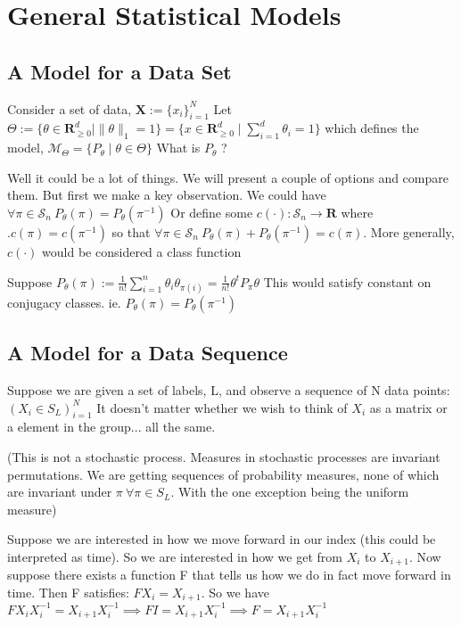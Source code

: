 \documentclass{article}
\theoremstyle{definition}
\begin{document}
\section{General Statistical Models}
\subsection{A Model for a Data Set}
Consider a set of data, \( \mathbf{X} := \{ x_i \}_{i=1}^N\)
Let \(
\Theta := \{ \theta \in \mathbf{R}_{\geq 0}^d \mid  \|\theta\|_1 = 1\} = \{x\in \mathbf{R}_{\geq 0}^d \mid \sum_{i=1}^d \theta_i = 1\} 
\) 
which defines the model, \(
\mathcal{M}_\Theta = \{ P_\theta \mid \theta \in \Theta \}
\)
What is $P_\theta$ ? 

Well it could be a lot of things. We will present a couple of options and compare them. But first we make a key observation. 
We could have $ \forall \pi \in \mathcal{S}_n \: P_\theta(\pi) = P_\theta(\pi^{-1}) $
Or define some $c(\cdot):\mathcal{S}_n \rightarrow \mathbf{R} $ where $. c(\pi) = c(\pi^{-1}) $ so that $ \forall \pi \in \mathcal{S}_n \: P_\theta(\pi) + P_\theta(\pi^{-1})  = c( \pi ) $. More generally, $c(\cdot) $ would be considered a class function

Suppose \( P_\theta(\pi) := \frac{1}{n!}\sum_{i=1}^n \theta_i\theta_{\pi(i)} = \frac{1}{n!}\theta^t P_\pi\theta \) 
This would satisfy constant on conjugacy classes. ie. $ P_\theta(\pi) = P_\theta(\pi^{-1}) $

\subsection{A Model for a Data Sequence}
Suppose we are given a set of labels, L, and observe a sequence of N data points: $ (X_i \in S_L)_{i=1}^N$
It doesn't matter whether we wish to think of $X_i$ as a matrix or a element in the group... all the same.

(This is not a stochastic process. Measures in stochastic processes are invariant permutations. We are getting sequences of probability measures, none of which are invariant under $\pi \: \forall \pi \in S_L$. With the one exception being the uniform measure)

Suppose we are interested in how we move forward in our index (this could be interpreted as time). So we are interested in how we get from $X_i$ to $X_{i+1}$. Now suppose there exists a function F that tells us how we do in fact move forward in time.
Then F satisfies: $F X_i = X_{i+1} $. So we have $FX_i X_i^{-1} = X_{i+1}X_i^{-1} \implies FI = X_{i+1}X_i^{-1} \implies F = X_{i+1}X_i^{-1} $ 
\end{document}
